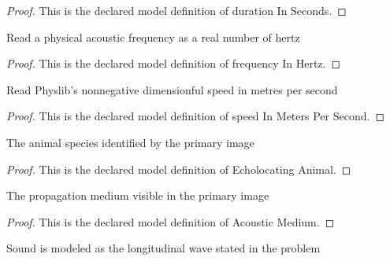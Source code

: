 \begin{proof}
  This is the declared model definition of duration In Seconds.
\end{proof}
\begin{definition}
  \label{def:physics:phyx-mini-0201:phyxminiproblems-problemphyxmini0201-frequencyinhertz}
  Read a physical acoustic frequency as a real number of hertz
\end{definition}
\begin{proof}
  This is the declared model definition of frequency In Hertz.
\end{proof}
\begin{definition}
  \label{def:physics:phyx-mini-0201:phyxminiproblems-problemphyxmini0201-speedinmeterspersecond}
  Read Physlib's nonnegative dimensionful speed in metres per second
\end{definition}
\begin{proof}
  This is the declared model definition of speed In Meters Per Second.
\end{proof}
\begin{definition}
  \label{def:physics:phyx-mini-0201:phyxminiproblems-problemphyxmini0201-echolocatinganimal}
  The animal species identified by the primary image
\end{definition}
\begin{proof}
  This is the declared model definition of Echolocating Animal.
\end{proof}
\begin{definition}
  \label{def:physics:phyx-mini-0201:phyxminiproblems-problemphyxmini0201-acousticmedium}
  The propagation medium visible in the primary image
\end{definition}
\begin{proof}
  This is the declared model definition of Acoustic Medium.
\end{proof}
\begin{definition}
  \label{def:physics:phyx-mini-0201:phyxminiproblems-problemphyxmini0201-acousticwavemode}
  Sound is modeled as the longitudinal wave stated in the problem
\end{definition}
